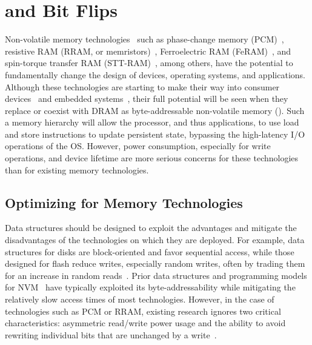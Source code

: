 
\section{\NVM and Bit Flips}
\label{sec:background}


Non-volatile memory technologies~\cite{burr:ibmjrd08} such as phase-change memory
(PCM)~\cite{lee_architecting_2009}, resistive RAM (RRAM, or
memristors)~\cite{strukov:nature08,shen:dtc11}, Ferroelectric RAM
(FeRAM)~\cite{fox:2001feram}, and spin-torque transfer RAM
(STT-RAM)~\cite{sttram}, among others, have the potential to fundamentally
change the design of devices, operating systems, and applications. Although
these technologies are starting to make their way into consumer
devices~\cite{intel3dxpoint} and embedded systems~\cite{shen:dtc11}, their full
potential will be seen when they replace or coexist with DRAM as
byte-addressable non-volatile memory (\NVM). Such a memory hierarchy will allow
the processor, and thus applications, to use load and store instructions to
update persistent state, bypassing the high-latency I/O operations of the
OS. However, power consumption, especially for write operations,
and device lifetime are more serious concerns for these technologies than
for existing memory technologies.

\subsection{Optimizing for Memory Technologies}

Data structures should be designed to exploit the advantages and mitigate the
disadvantages of the technologies on which they are deployed.  For example, data
structures for disks are block-oriented and favor sequential access, while those
designed for flash reduce writes, especially random writes, often by trading them for an increase in
random reads~\cite{colgrove:sigmod15}.  Prior data structures and programming
models for
NVM~\cite{xu:fast16,meza:weed13,greenan:hotdep07,volos:asplos11,coburn:asplos11,condit:sosp09}
have typically exploited its byte-addressability while mitigating the relatively
slow access times of most \NVM technologies.  However, in the case of
technologies such as PCM or RRAM, existing research ignores two critical
characteristics: asymmetric read/write power usage and the ability to avoid
rewriting individual bits that are unchanged by a
write~\cite{burr:ibmjrd08,yang:iscas07}.

